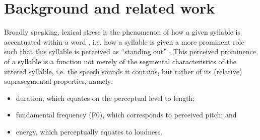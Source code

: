 \documentclass[a4paper]{article}
\newcommand{\TODO}[1]{{\color{red}\textbf{[TODO #1]}}}
\begin{document}
	\section{Background and related work}
	\label{sec:bkgd}
	

Broadly speaking, lexical stress is the phenomenon of how a given syllable is accentuated within a word \cite{Cutler2005}, i.e. how a syllable is given a more prominent role such that this syllable is perceived as ``standing out'' \cite{Dogil1999}. This perceived prominence of a syllable is a function not merely of the segmental characteristics of the uttered syllable, i.e. the speech sounds it contains, but rather of its (relative) suprasegmental properties, namely:
\begin{itemize}[topsep=.5em,noitemsep]
\item duration, which equates on the perceptual level to length;
\item fundamental frequency (F0), which corresponds to perceived pitch; and 
\item energy,
which perceptually equates to loudness.
\end{itemize}
\end{document}
